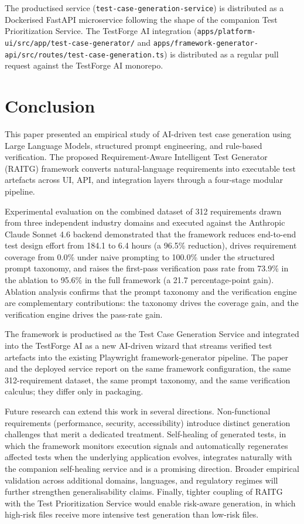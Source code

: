 \documentclass[11pt,letterpaper]{article}
\begin{document}
The productised service (\texttt{test-case-generation-service}) is distributed as a Dockerised FastAPI microservice following the shape of the companion Test Prioritization Service. The TestForge AI integration (\texttt{apps/platform-ui/src/app/test-case-generator/} and \texttt{apps/framework-generator-api/src/routes/test-case-generation.ts}) is distributed as a regular pull request against the TestForge AI monorepo.

\section{Conclusion}
\label{sec:conclusion}

This paper presented an empirical study of AI-driven test case generation using Large Language Models, structured prompt engineering, and rule-based verification. The proposed Requirement-Aware Intelligent Test Generator (RAITG) framework converts natural-language requirements into executable test artefacts across UI, API, and integration layers through a four-stage modular pipeline.

Experimental evaluation on the combined dataset of 312 requirements drawn from three independent industry domains and executed against the Anthropic Claude Sonnet 4.6 backend demonstrated that the framework reduces end-to-end test design effort from 184.1 to 6.4 hours (a 96.5\% reduction), drives requirement coverage from 0.0\% under naive prompting to 100.0\% under the structured prompt taxonomy, and raises the first-pass verification pass rate from 73.9\% in the ablation to 95.6\% in the full framework (a 21.7 percentage-point gain). Ablation analysis confirms that the prompt taxonomy and the verification engine are complementary contributions: the taxonomy drives the coverage gain, and the verification engine drives the pass-rate gain.

The framework is productised as the Test Case Generation Service and integrated into the TestForge AI as a new AI-driven wizard that streams verified test artefacts into the existing Playwright framework-generator pipeline. The paper and the deployed service report on the same framework configuration, the same 312-requirement dataset, the same prompt taxonomy, and the same verification calculus; they differ only in packaging.

Future research can extend this work in several directions. Non-functional requirements (performance, security, accessibility) introduce distinct generation challenges that merit a dedicated treatment. Self-healing of generated tests, in which the framework monitors execution signals and automatically regenerates affected tests when the underlying application evolves, integrates naturally with the companion self-healing service and is a promising direction. Broader empirical validation across additional domains, languages, and regulatory regimes will further strengthen generalisability claims. Finally, tighter coupling of RAITG with the Test Prioritization Service would enable risk-aware generation, in which high-risk files receive more intensive test generation than low-risk files.
\end{document}
